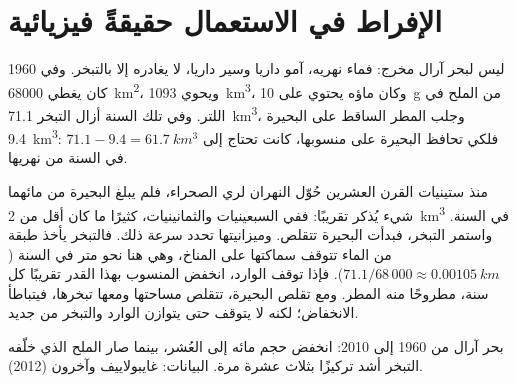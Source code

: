 \section{الإفراط في الاستعمال حقيقةً فيزيائية}

ليس لبحر آرال مخرج: فماء نهريه، آمو داريا
وسير داريا، لا يغادره إلا بالتبخر. وفي 1960 كان يغطي
\qty{68000}{km^2}، ويحوي \qty{1093}{km^3}، وكان ماؤه يحتوي على \qty{10}{g}
من الملح في اللتر. وفي تلك السنة أزال التبخر \qty{71.1}{km^3}، وجلب المطر الساقط
على البحيرة \qty{9.4}{km^3}: فلكي تحافظ البحيرة على منسوبها، كانت تحتاج إلى
$71.1 - 9.4 = \qty{61.7}{km^3}$ في السنة من نهريها.

منذ ستينيات القرن العشرين حُوّل النهران لري الصحراء، فلم يبلغ البحيرة من مائهما شيء
يُذكر تقريبًا: ففي السبعينيات والثمانينيات، كثيرًا ما كان أقل
من \qty{2}{km^3} في السنة. واستمر التبخر، فبدأت البحيرة
تتقلص. وميزانيتها تحدد سرعة ذلك. فالتبخر يأخذ طبقة من الماء
تتوقف سماكتها على المناخ، وهي هنا نحو متر في السنة
($71.1/68\,000 \approx \qty{0.00105}{km}$). فإذا توقف الوارد، انخفض المنسوب
بهذا القدر تقريبًا كل سنة، مطروحًا منه المطر. ومع تقلص البحيرة، تتقلص مساحتها
ومعها تبخرها، فيتباطأ الانخفاض؛ لكنه لا
يتوقف حتى يتوازن الوارد والتبخر من جديد.

\begin{omfigure}

{\small بحر آرال من 1960 إلى 2010: انخفض حجم مائه إلى
العُشر، بينما صار الملح الذي خلّفه التبخر أشد تركيزًا بثلاث عشرة مرة. البيانات:
غايبولاييف وآخرون (2012).}
\end{omfigure}

